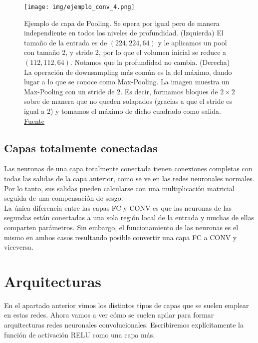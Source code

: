         \begin{figure}[H]
            \centering
            \texttt{[image: img/ejemplo\_conv\_4.png]}
            \caption{Ejemplo de capa de Pooling. Se opera por igual pero de manera independiente en todos los niveles de profundidad. (Izquierda)  El tamaño de la entrada es de $(224,224,64)$ y le aplicamos un pool con tamaño 2, y stride 2, por lo que el volumen inicial se reduce a $(112,112,64)$. Notamos que la profundidad no cambia. (Derecha)  La operación de downsampling más común es la del máximo, dando lugar a lo que se conoce como Max-Pooling. La imagen muestra un Max-Pooling con un stride de 2. Es decir, formamos bloques de $2 \times 2$ sobre de manera que no queden solapados (gracias a que el stride es igual a 2) y tomamos el máximo de dicho cuadrado como salida. \href{https://cs231n.github.io/convolutional-networks/}{Fuente}}
            \label{fig:ejemplo_conv_4}
        \end{figure}
        
        
        
        

        \subsection{Capas totalmente conectadas}
        
            Las neuronas de una capa totalmente conectada tienen conexiones completas con todas las salidas de la capa anterior, como se ve en las redes neuronales normales. Por lo tanto, sus salidas pueden calcularse con una multiplicación matricial seguida de una compensación de sesgo.\\
            
            La única diferencia entre las capas FC y CONV es que las neuronas de las segundas están conectadas a una sola región local de la entrada y muchas de ellas comparten parámetros. Sin embargo, el funcionamiento de las neuronas es el mismo en ambos casos resultando posible convertir una capa FC a CONV y viceversa. \\
            
            
        
    
    
\section{Arquitecturas}
    
    En el apartado anterior vimos los distintos tipos de capas que se suelen emplear en estas redes. Ahora vamos a ver cómo se suelen apilar para formar arquitecturas redes neuronales convolucionales. Escribiremos explícitamente la función de activación RELU como una capa más. \\
    
